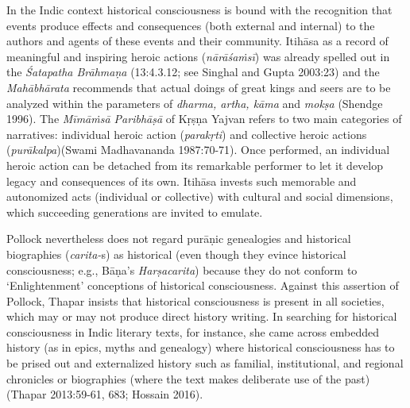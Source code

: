 In the Indic context historical consciousness is bound with the recognition that events produce effects and consequences (both external and internal) to the authors and agents of these events and their community. Itihāsa as a record of meaningful and inspiring heroic actions (\textit{nārāśaṁsī}) was already spelled out in the \textit{Śatapatha Brāhmaṇa} (13:4.3.12; see Singhal and Gupta 2003:23) and the \textit{Mahābhārata} recommends that actual doings of great kings and seers are to be analyzed within the parameters of \textit{dharma, artha, kāma} and \textit{mokṣa} (Shendge 1996). The \textit{Mīmāṁsā Paribhāṣā} of Kṛṣṇa Yajvan refers to two main categories of narratives: individual heroic action (\textit{parakṛti}) and collective heroic actions (\textit{purākalpa})(Swami Madhavananda 1987:70-71). Once performed, an individual heroic action can be detached from its remarkable performer to let it develop legacy and consequences of its own. Itihāsa invests such memorable and autonomized acts (individual or collective) with cultural and social dimensions, which succeeding generations are invited to emulate.

Pollock nevertheless does not regard purāṇic genealogies and historical biographies (\textit{carita-}s) as historical (even though they evince historical consciousness; e.g., Bāṇa’s \textit{Harṣacarita}) because they do not conform to ‘Enlightenment’ conceptions of historical consciousness. Against this assertion of Pollock, Thapar insists that historical consciousness is present in all societies, which may or may not produce direct history writing. In searching for historical consciousness in Indic literary texts, for instance, she came across embedded history (as in epics, myths and genealogy) where historical consciousness has to be prised out and externalized history such as familial, institutional, and regional chronicles or biographies (where the text makes deliberate use of the past)(Thapar 2013:59-61, 683; Hossain 2016).


